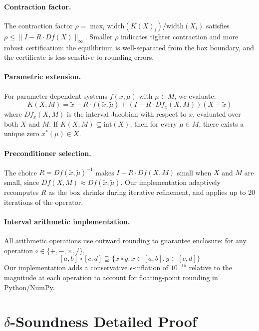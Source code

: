 \documentclass[11pt]{article}
\newcommand{\norm}[1]{\|#1\|}
\begin{document}
\paragraph{Contraction factor.}
The contraction factor $\rho = \max_i \mathrm{width}(K(X)_i) / \mathrm{width}(X_i)$ satisfies $\rho \leq \norm{I - R \cdot Df(X)}_\infty$.
Smaller $\rho$ indicates tighter contraction and more robust certification: the equilibrium is well-separated from the box boundary, and the certificate is less sensitive to rounding errors.

\paragraph{Parametric extension.}
For parameter-dependent systems $f(x, \mu)$ with $\mu \in M$, we evaluate:
\[
K(X; M) = \tilde{x} - R \cdot f(\tilde{x}, \tilde{\mu}) + (I - R \cdot Df_x(X, M))(X - \tilde{x})
\]
where $Df_x(X, M)$ is the interval Jacobian with respect to $x$, evaluated over both $X$ and $M$.
If $K(X; M) \subseteq \mathrm{int}(X)$, then for every $\mu \in M$, there exists a unique zero $x^*(\mu) \in X$.

\paragraph{Preconditioner selection.}
The choice $R = Df(\tilde{x}, \tilde{\mu})^{-1}$ makes $I - R \cdot Df(X, M)$ small when $X$ and $M$ are small, since $Df(X, M) \approx Df(\tilde{x}, \tilde{\mu})$.
Our implementation adaptively recomputes $R$ as the box shrinks during iterative refinement, and applies up to 20 iterations of the operator.

\paragraph{Interval arithmetic implementation.}
All arithmetic operations use outward rounding to guarantee enclosure: for any operation $\circ \in \{+, -, \times, /\}$,
\[
[a, b] \circ [c, d] \supseteq \{x \circ y : x \in [a, b], y \in [c, d]\}
\]
Our implementation adds a conservative $\epsilon$-inflation of $10^{-15}$ relative to the magnitude at each operation to account for floating-point rounding in Python/NumPy.

\section{$\delta$-Soundness Detailed Proof}
\label{app:delta}
\end{document}

